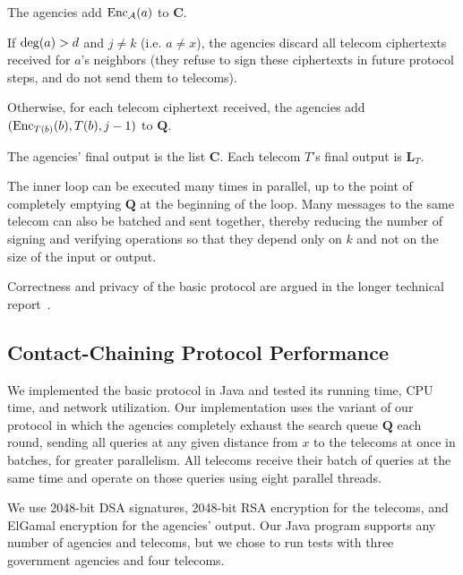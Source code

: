 \begin{compactenum}
\begin{compactenum}
\item \label{proto1:receive} The agencies add $\operatorname{Enc}_\mathcal{A}(a)$ to $\mathbf{C}$.

\item If $\operatorname{deg}(a)>d$ and $j\neq k$ (i.e. $a\neq x$), the agencies discard all
telecom ciphertexts received for $a$'s neighbors (they refuse to sign
these ciphertexts in future protocol steps, and do not send them to
telecoms).

\item Otherwise, for each telecom ciphertext received, the agencies add $(\operatorname{Enc}_{T(b)}(b), T(b), j-1)$ to $\mathbf{Q}$.

\end{compactenum}

\item The agencies' final output is the list $\mathbf{C}$. Each telecom $T$'s final output is $\mathbf{L}_T$.

\end{compactenum}

The inner loop can be executed many times in parallel, up to the
point of completely emptying $\mathbf{Q}$ at the beginning of the loop. Many
messages to the same telecom can also be batched and sent together, thereby
reducing the number of signing and verifying operations so that they depend
only on $k$ and not on the size of the input or output.

Correctness and privacy of the basic protocol are argued 
in the longer technical report~\cite[Section 4.2]{sff-TR}.

\subsection{Contact-Chaining Protocol Performance}



We implemented the basic protocol in Java and tested its
running time, CPU time, and network utilization.
Our implementation uses the variant of our protocol in which the agencies 
completely exhaust the search queue $\mathbf{Q}$ each round, 
sending all queries at any given distance from $x$ to the 
telecoms at once in batches, for greater parallelism. 
All telecoms receive their batch of queries at the same time and 
operate on those queries using eight parallel threads.

We use 2048-bit DSA signatures, 2048-bit RSA encryption for the telecoms, 
and ElGamal encryption for the agencies' output. 
Our Java program supports any number of agencies and telecoms, but we chose to run tests with three government agencies and four telecoms. 

